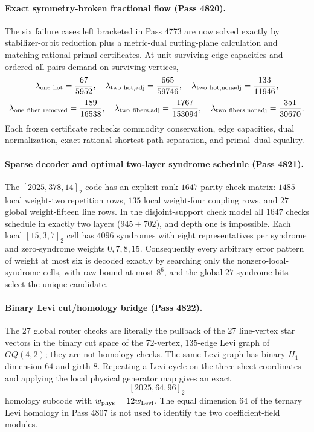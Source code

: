 \paragraph{Exact symmetry-broken fractional flow (Pass 4820).}
The six failure cases left bracketed in Pass 4773 are now solved exactly by stabilizer-orbit reduction plus a metric-dual cutting-plane calculation and matching rational primal certificates.  At unit surviving-edge capacities and ordered all-pairs demand on surviving vertices,
\[
\lambda_{\rm one\ hot}=\frac{67}{5952},\quad
\lambda_{\rm two\ hot,adj}=\frac{665}{59746},\quad
\lambda_{\rm two\ hot,nonadj}=\frac{133}{11946},
\]
\[
\lambda_{\rm one\ fiber\ removed}=\frac{189}{16538},\quad
\lambda_{\rm two\ fibers,adj}=\frac{1767}{153094},\quad
\lambda_{\rm two\ fibers,nonadj}=\frac{351}{30670}.
\]
Each frozen certificate rechecks commodity conservation, edge capacities, dual normalization, exact rational shortest-path separation, and primal--dual equality.

\paragraph{Sparse decoder and optimal two-layer syndrome schedule (Pass 4821).}
The $[2025,378,14]_2$ code has an explicit rank-$1647$ parity-check matrix: $1485$ local weight-two repetition rows, $135$ local weight-four coupling rows, and $27$ global weight-fifteen line rows.  In the disjoint-support check model all $1647$ checks schedule in exactly two layers ($945+702$), and depth one is impossible.  Each local $[15,3,7]_2$ cell has $4096$ syndromes with eight representatives per syndrome and zero-syndrome weights $0,7,8,15$.  Consequently every arbitrary error pattern of weight at most six is decoded exactly by searching only the nonzero-local-syndrome cells, with raw bound at most $8^6$, and the global $27$ syndrome bits select the unique candidate.

\paragraph{Binary Levi cut/homology bridge (Pass 4822).}
The $27$ global router checks are literally the pullback of the $27$ line-vertex star vectors in the binary cut space of the $72$-vertex, $135$-edge Levi graph of $GQ(4,2)$; they are not homology checks.  The same Levi graph has binary $H_1$ dimension $64$ and girth $8$.  Repeating a Levi cycle on the three sheet coordinates and applying the local physical generator map gives an exact
\[
\boxed{[2025,64,96]_2}
\]
homology subcode with $w_{\rm phys}=12w_{\rm Levi}$.  The equal dimension $64$ of the ternary Levi homology in Pass 4807 is not used to identify the two coefficient-field modules.

